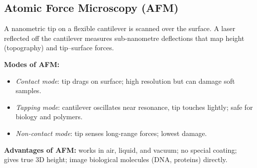 \documentclass[12pt,a4paper]{article}
\begin{document}
\subsection{Atomic Force Microscopy (AFM)}
A nanometric tip on a flexible cantilever is scanned over the surface. A laser reflected off the cantilever measures sub-nanometre deflections that map height (topography) and tip--surface forces.

\begin{tcolorbox}[tikzbox, title={Working Principle of AFM}]
\centering
{}
\end{tcolorbox}

\textbf{Modes of AFM:}
\begin{itemize}[leftmargin=*, itemsep=1pt, topsep=2pt]
  \item \emph{Contact mode}: tip drags on surface; high resolution but can damage soft samples.
  \item \emph{Tapping mode}: cantilever oscillates near resonance, tip touches lightly; safe for biology and polymers.
  \item \emph{Non-contact mode}: tip senses long-range forces; lowest damage.
\end{itemize}

\textbf{Advantages of AFM:} works in air, liquid, and vacuum; no special coating; gives true 3D height; image biological molecules (DNA, proteins) directly.
\end{document}
